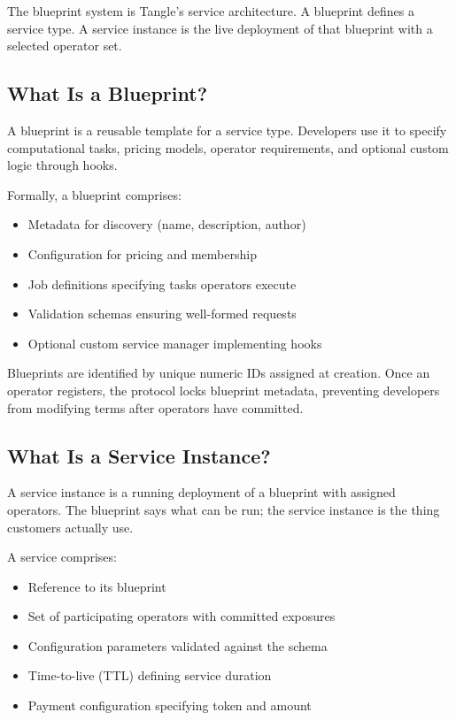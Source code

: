 \documentclass[11pt,a4paper]{article}
\begin{document}
The blueprint system is Tangle's service architecture. A blueprint defines a service type. A service instance is the live deployment of that blueprint with a selected operator set.

\subsection{What Is a Blueprint?}

A blueprint is a reusable template for a service type. Developers use it to specify computational tasks, pricing models, operator requirements, and optional custom logic through hooks.

Formally, a blueprint comprises:
\begin{itemize}[noitemsep]
    \item Metadata for discovery (name, description, author)
    \item Configuration for pricing and membership
    \item Job definitions specifying tasks operators execute
    \item Validation schemas ensuring well-formed requests
    \item Optional custom service manager implementing hooks
\end{itemize}

Blueprints are identified by unique numeric IDs assigned at creation. Once an operator registers, the protocol locks blueprint metadata, preventing developers from modifying terms after operators have committed.

\subsection{What Is a Service Instance?}

A service instance is a running deployment of a blueprint with assigned operators. The blueprint says what can be run; the service instance is the thing customers actually use.

A service comprises:
\begin{itemize}[noitemsep]
    \item Reference to its blueprint
    \item Set of participating operators with committed exposures
    \item Configuration parameters validated against the schema
    \item Time-to-live (TTL) defining service duration
    \item Payment configuration specifying token and amount
\end{itemize}
\end{document}
